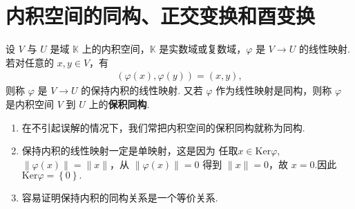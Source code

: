 \documentclass[../../main.tex]{subfiles}
\begin{document}
\section{内积空间的同构、正交变换和酉变换}

\begin{definition}[保积同构]
设 $V$ 与 $U$ 是域 $\mathbb{K}$ 上的内积空间，$\mathbb{K}$ 是实数域或复数域，$\varphi$ 是 $V \to U$ 的线性映射. 若对任意的 $x,y \in V$，有
\begin{align*}
(\varphi(x),\varphi(y)) = (x,y),
\end{align*}
则称 $\varphi$ 是 $V \to U$ 的保持内积的线性映射. 又若 $\varphi$ 作为线性映射是同构，则称 $\varphi$ 是内积空间 $V$ 到 $U$ 上的\textbf{保积同构}.
\end{definition}
\begin{remark}
\begin{enumerate}
\item 在不引起误解的情况下，我们常把内积空间的保积同构就称为同构.

\item 保持内积的线性映射一定是单映射，这是因为 任取$x\in \mathrm{Ker}\varphi $,$\|\varphi(x)\| = \|x\|$，从 $\|\varphi(x)\| = 0$ 得到 $\|x\| = 0$，故 $x = 0$.因此$\mathrm{Ker}\varphi =\left\{ 0 \right\} .$

\item 容易证明保持内积的同构关系是一个等价关系.
\end{enumerate}
\end{remark}
\end{document}
